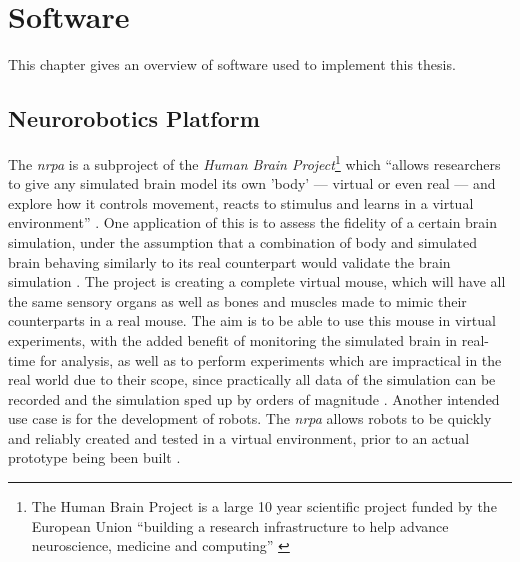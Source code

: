 
\chapter{Software}\label{chapter:Software}

This chapter gives an overview of software used to implement this thesis.


\section{Neurorobotics Platform}\label{section:NeuroroboticsPlatform}

The \textit{\gls{nrpa}} is a subproject of the \textit{Human Brain Project}\footnote{The Human Brain Project is a large 10 year scientific project funded by the European Union \enquote{building a research infrastructure to help advance neuroscience, medicine and computing} \autocite{hbpOverview}} which \enquote{allows researchers to give any simulated brain model its own 'body' — virtual or even real — and explore how it controls movement, reacts to stimulus and learns in a virtual environment} \autocite{neuroroboticsOverview}.
\newline
One application of this is to assess the fidelity of a certain brain simulation, under the assumption that a combination of body and simulated brain behaving similarly to its real counterpart would validate the brain simulation \autocite{neuroroboticsOverview}. The project is creating a complete virtual mouse, which will have all the same sensory organs as well as bones and muscles made to mimic their counterparts in a real mouse. The aim is to be able to use this mouse in virtual experiments, with the added benefit of monitoring the simulated brain in real-time for analysis, as well as to perform experiments which are impractical in the real world due to their scope, since practically all data of the simulation can be recorded and the simulation sped up by orders of magnitude \autocite{neuroroboticsVision}. Another intended use case is for the development of robots. The \textit{\gls{nrpa}} allows robots to be quickly and reliably created and tested in a virtual environment, prior to an actual prototype being been built \autocite{neuroroboticsOverview}.
\newline

